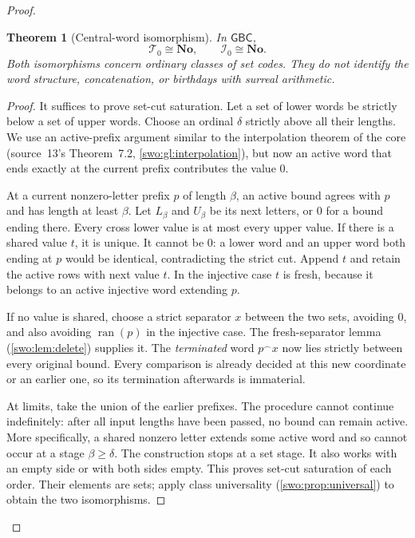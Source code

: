 \documentclass[11pt]{article}
\newtheorem{theorem}{Theorem}[section]
\theoremstyle{definition}
\theoremstyle{remark}
\newcommand{\No}{\mathbf{No}}
\newcommand{\I}{\mathcal I}
\newcommand{\WordsAll}{\mathcal T}
\newcommand{\ran}{\operatorname{ran}}
\newcommand{\cat}{\mathbin{{}^\frown}}
\newcommand{\GBC}{\mathsf{GBC}}
\begin{document}
\begin{proof}
\begin{theorem}[Central-word isomorphism]\label{swo:fs:thm:central}
In $\GBC$,
\[
                          \WordsAll_0\cong\No,
                  \qquad \I_0\cong\No.
\]
Both isomorphisms concern ordinary classes of set codes. They do not
identify the word structure, concatenation, or birthdays with surreal
arithmetic.
\end{theorem}
\begin{proof}
It suffices to prove set-cut saturation. Let a set of lower words be
strictly below a set of upper words. Choose an ordinal $\delta$
strictly above all their lengths. We use an active-prefix argument
similar to the interpolation theorem of the core (source~13's Theorem~7.2, \cref{swo:gl:interpolation}), but now an active word
that ends exactly at the current prefix contributes the value $0$.

At a current nonzero-letter prefix $p$ of length $\beta$, an active
bound agrees with $p$ and has length at least $\beta$. Let $L_\beta$
and $U_\beta$ be its next letters, or $0$ for a bound ending there.
Every cross lower value is at most every upper value. If there is a
shared value $t$, it is unique. It cannot be $0$: a lower word and an
upper word both ending at $p$ would be identical, contradicting the
strict cut. Append $t$ and retain the active rows with next value $t$.
In the injective case $t$ is fresh, because it belongs to an active
injective word extending $p$.

If no value is shared, choose a strict separator $x$ between the two
sets, avoiding $0$, and also avoiding $\ran(p)$ in the injective
case. The fresh-separator lemma (\cref{swo:lem:delete}) supplies it. The \emph{terminated}
word $p\cat x$ now lies strictly between every original bound. Every
comparison is already decided at this new coordinate or an earlier
one, so its termination afterwards is immaterial.

At limits, take the union of the earlier prefixes. The procedure
cannot continue indefinitely: after all input lengths have been
passed, no bound can remain active. More specifically, a shared
nonzero letter extends some active word and so cannot occur at a
stage $\beta\geq\delta$. The construction stops at a set stage.
It also works with an empty side or with both sides empty. This proves
set-cut saturation of each order. Their elements are sets; apply
class universality (\cref{swo:prop:universal}) to obtain the two isomorphisms.
\end{proof}


\end{proof}
\end{document}
